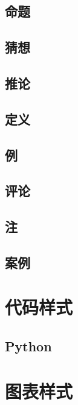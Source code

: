\subsection{命题}
\subsection{猜想}
\subsection{推论}
\subsection{定义}
\subsection{例}
\subsection{评论}
\subsection{注}
\subsection{案例}
\clearpage
\section[代码样式]{代码样式}
\subsection{Python}

\clearpage
\section[图表样式]{图表样式}
